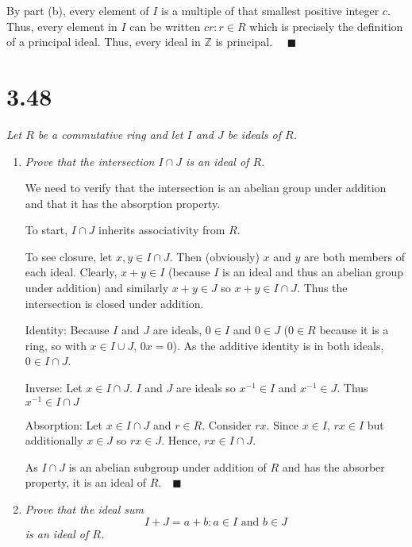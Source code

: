 \documentclass[12pt]{article}
\newcommand{\Z}{\mathbb{Z}}
\newcommand{\qed}{\quad \blacksquare}
\begin{document}
\begin{enumerate}[label=(\alph*)]
                By part (b), every element of $I$ is a multiple of that smallest positive integer $c$. Thus, every element in $I$ can be written $cr : r \in R$ which is precisely the definition of a principal ideal. Thus, every ideal in $\Z$ is principal. $\qed$
            \color{black}
    \end{enumerate}
\pagebreak

\section*{3.48}
    \emph{Let $R$ be a commutative ring and let $I$ and $J$ be ideals of $R$.}
    \begin{enumerate}[label=(\alph*)]
        \item \emph{Prove that the intersection $I \cap J$ is an ideal of $R$.}
        
            \color{blue}
                We need to verify that the intersection is an abelian group under addition and that it has the absorption property.

                To start, $I \cap J$ inherits associativity from $R$. 
                
                To see closure, let $x, y \in I \cap J$. Then (obviously) $x$ and $y$ are both members of each ideal. Clearly, $x + y \in I$ (because $I$ is an ideal and thus an abelian group under addition) and similarly $x + y \in J$ so $x + y \in I\cap J$. Thus the intersection is closed under addition. 

                Identity: Because $I$ and $J$ are ideals, $0 \in I$ and $0 \in J$ ($0 \in R$ because it is a ring, so with $x \in I \cup J$, $0x = 0$). As the additive identity is in both ideals, $0 \in I\cap J$.

                Inverse: Let $x \in I \cap J$. $I$ and $J$ are ideals so $x^{-1} \in I$ and $x^{-1} \in J$. Thus $x^{-1} \in I \cap J$

                Absorption: Let $x \in I \cap J$ and $r \in R$. Consider $rx$. Since $x \in I$, $rx \in I$ but additionally $x \in J$ so $rx \in J$. Hence, $rx \in I\cap J$. 
                
                As $I \cap J$ is an abelian subgroup under addition of $R$ and has the absorber property, it is an ideal of $R. \qed$
            \color{black}

        \item \emph{Prove that the ideal sum}
        \[I + J = {a + b : a \in I\text{ and }b \in J}\]
        \emph{is an ideal of $R$.}


\end{enumerate}
\end{document}
